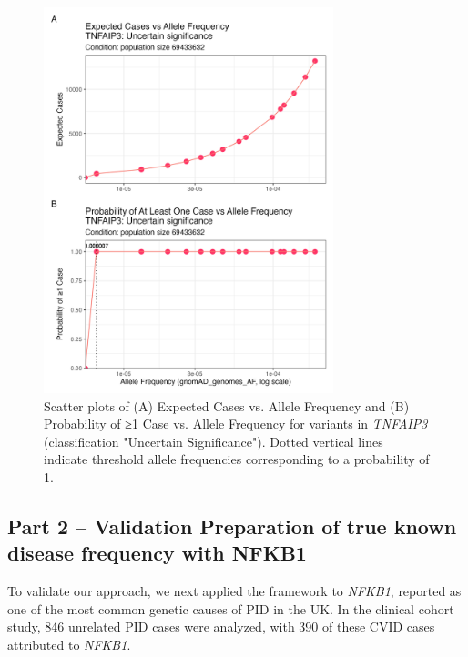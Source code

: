 \begin{figure}[ht]
  \centering
  \includegraphics[width=0.75\textwidth]{../images/tnfaip3_scatter_expected_prob.png}
  \caption{Scatter plots of (A) Expected Cases vs. Allele Frequency and (B) Probability of ≥1 Case vs. Allele Frequency for variants in \textit{TNFAIP3} (classification "Uncertain Significance"). Dotted vertical lines indicate threshold allele frequencies corresponding to a probability of 1.}
  \label{fig:tnfaip3_scatter_expected_prob}
\end{figure}

\subsection{Part 2 -- Validation Preparation of true known disease frequency with NFKB1}
To validate our approach, we next applied the framework to \textit{NFKB1}, reported as one of the most common genetic causes of PID in the UK. In the clinical cohort study, 846 unrelated PID cases were analyzed, with 390 of these CVID cases attributed to \textit{NFKB1}. 

